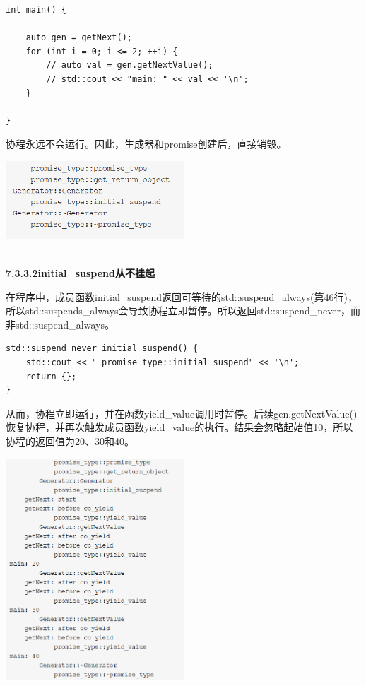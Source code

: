 \begin{lstlisting}[style=styleCXX]
int main() {
	
	auto gen = getNext();
	for (int i = 0; i <= 2; ++i) {
		// auto val = gen.getNextValue();
		// std::cout << "main: " << val << '\n';
	}

}
\end{lstlisting}

协程永远不会运行。因此，生成器和promise创建后，直接销毁。

\begin{center}
\includegraphics[width=0.5\textwidth]{content/3/chapter7/images/15.png}\\
\end{center}

\hspace*{\fill} \\ %
\noindent
\textbf{7.3.3.2\hspace{0.2cm}initial\_suspend从不挂起}

在程序中，成员函数initial\_suspend返回可等待的std::suspend\_always(第46行)，所以std::suspends\_always会导致协程立即暂停。所以返回std::suspend\_never，而非std::suspend\_always。

\begin{lstlisting}[style=styleCXX]
std::suspend_never initial_suspend() {
	std::cout << " promise_type::initial_suspend" << '\n';
	return {};
}
\end{lstlisting}

从而，协程立即运行，并在函数yield\_value调用时暂停。后续gen.getNextValue()恢复协程，并再次触发成员函数yield\_value的执行。结果会忽略起始值10，所以协程的返回值为20、30和40。

\begin{center}
\includegraphics[width=0.5\textwidth]{content/3/chapter7/images/16.png}\\
\end{center}

